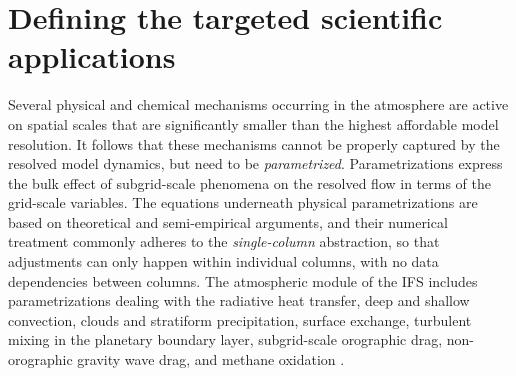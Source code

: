 \documentclass[gmd,manuscript,online]{copernicus}
\theoremstyle{theorem}
\theoremstyle{definition}
\theoremstyle{remark}
\theoremstyle{proposition}
\begin{document}
	\section{Defining the targeted scientific applications}
	\label{section:target-cloud-microphysics-schemes}

	Several physical and chemical mechanisms occurring in the atmosphere are active on spatial scales that are significantly smaller than the highest affordable model resolution. It follows that these mechanisms cannot be properly captured by the resolved model dynamics, but need to be \emph{parametrized}. Parametrizations express the bulk effect of subgrid-scale phenomena on the resolved flow in terms of the grid-scale variables. The equations underneath physical parametrizations are based on theoretical and semi-empirical arguments, and their numerical treatment commonly adheres to the \emph{single-column} abstraction, so that adjustments can only happen within individual columns, with no data dependencies between columns. The atmospheric module of the IFS includes parametrizations dealing with the radiative heat transfer, deep and shallow convection, clouds and stratiform precipitation, surface exchange, turbulent mixing in the planetary boundary layer, subgrid-scale orographic drag, non-orographic gravity wave drag, and methane oxidation \citep{ifs48r1}.
\end{document}
